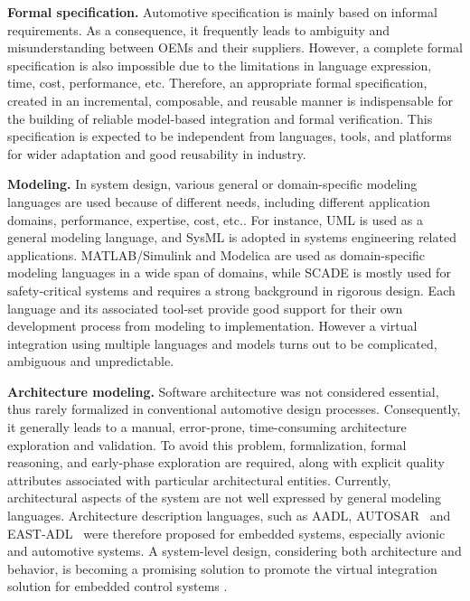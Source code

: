 \vspace{0.6em}
\indent\indent\textbf{Formal specification.}
Automotive specification is mainly based on informal requirements. As a consequence, it frequently leads to ambiguity and misunderstanding between OEMs and their suppliers. However, a complete formal specification is also impossible due to the limitations in language expression, time, cost, performance, etc. Therefore, an appropriate formal specification, created in an incremental, composable, and reusable manner is indispensable for the building of reliable model-based integration and formal verification. This specification is expected to be independent from languages, tools, and platforms for wider adaptation and good reusability in industry.

\vspace{0.6em}
\textbf{Modeling.}
In system design, various general or domain-specific modeling languages are used \cite{muller-glaser:2004-tcst} because of different needs, including different application domains, performance, expertise, cost, etc.. For instance, UML is used as a general modeling language, and SysML is adopted in systems engineering related applications. MATLAB/Simulink and Modelica are used as domain-specific modeling languages in a wide span of domains, while SCADE is mostly used for safety-critical systems and requires a strong background in rigorous design. Each language and its associated tool-set provide good support for their own development process from modeling to implementation. However a virtual integration using multiple languages and models turns out to be complicated, ambiguous and unpredictable. 

\vspace{0.6em}
\textbf{Architecture modeling.}
Software architecture \cite{shaw1996software} was not considered essential, thus rarely formalized in conventional automotive design processes. Consequently, it generally leads to a manual, error-prone, time-consuming architecture exploration and validation. 
To avoid this problem, formalization, formal reasoning, and early-phase exploration are required, along with explicit quality attributes associated with particular architectural entities. 
Currently, architectural aspects of the system are not well expressed by general modeling languages. Architecture description languages, such as AADL\cite{AADLv2-AS5506A}, 
AUTOSAR~\cite{AUTOSAR} and EAST-ADL~\cite{EAST-ADL} were therefore proposed for embedded systems, especially avionic and automotive systems.  
A system-level design, considering both architecture and behavior, is becoming a promising solution to promote the virtual integration solution for embedded control systems \cite{feiler09, yu:2013-jsa}.



